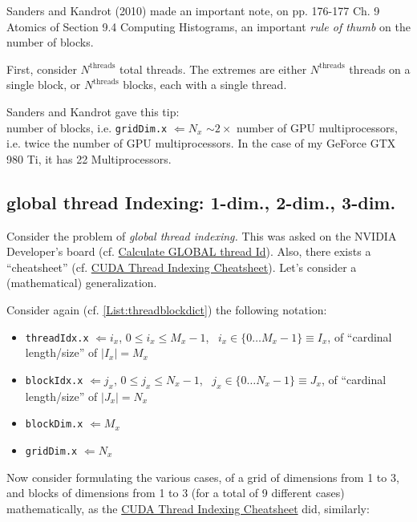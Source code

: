 \documentclass[10pt]{amsart}
\begin{document}
\begin{multicols*}{2}
 Sanders and Kandrot (2010) \cite{SK2010} made an important note, on pp. 176-177 Ch. 9 Atomics of Section 9.4 Computing Histograms, an important \emph{rule of thumb} on the number of blocks.

 First, consider $N^{\text{threads}}$ total threads.  The extremes are either $N^{\text{threads}}$ threads on a single block, or $N^{\text{threads}}$ blocks, each with a single thread.

 Sanders and Kandrot gave this tip:  \\

 number of blocks, i.e. \verb|gridDim.x| $\Longleftarrow N_x$ $\sim 2 \times $ number of GPU multiprocessors, i.e. twice the number of GPU multiprocessors.  In the case of my GeForce GTX 980 Ti, it has 22 Multiprocessors.  

 \subsection{global thread Indexing: 1-dim., 2-dim., 3-dim.}

 Consider the problem of \emph{global thread indexing.}  This was asked on the NVIDIA Developer's board (cf. \href{https://devtalk.nvidia.com/default/topic/498642/calculate-global-thread-id/?offset=2}{Calculate GLOBAL thread Id}).  Also, there exists a ``cheatsheet'' (cf. \href{https://cs.calvin.edu/courses/cs/374/CUDA/CUDA-Thread-Indexing-Cheatsheet.pdf}{CUDA Thread Indexing Cheatsheet}).  Let's consider a (mathematical) generalization.

Consider again (cf. \ref{List:threadblockdict}) the following notation: 
\begin{itemize}
\item \verb|threadIdx.x| $\Longleftarrow i_x$, $0\leq i_x \leq M_x -1$, \qquad \, $i_x \in \lbrace 0 \dots M_x - 1\rbrace \equiv I_x$, of ``cardinal length/size'' of $|I_x| = M_x$
\item \verb|blockIdx.x| $\Longleftarrow j_x$, $0\leq j_x \leq N_x -1$, \qquad \, $j_x \in \lbrace 0 \dots N_x - 1\rbrace \equiv J_x$, of ``cardinal length/size'' of $|J_x| = N_x$
\item \verb|blockDim.x| $\Longleftarrow M_x$
  \item \verb|gridDim.x| $\Longleftarrow N_x$
\end{itemize}

Now consider formulating the various cases, of a grid of dimensions from 1 to 3, and blocks of dimensions from 1 to 3 (for a total of 9 different cases) mathematically, as the \href{https://cs.calvin.edu/courses/cs/374/CUDA/CUDA-Thread-Indexing-Cheatsheet.pdf}{CUDA Thread Indexing Cheatsheet} did, similarly:


\end{multicols*}
\end{document}
